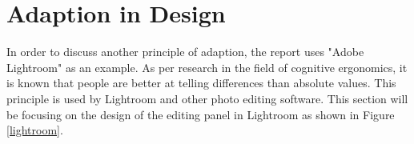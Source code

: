 \documentclass[12pt]{article}
\begin{document}
%	
%	
%	

\section{Adaption in Design}
In order to discuss another principle of adaption, the report uses "Adobe Lightroom" as an example. As per research in the field of cognitive ergonomics, it is known that people are better at telling differences than absolute values. This principle is used by Lightroom and other photo editing software. This section will be focusing on the design of the editing panel in Lightroom as shown in Figure \ref{lightroom}. 
	
\end{document}
